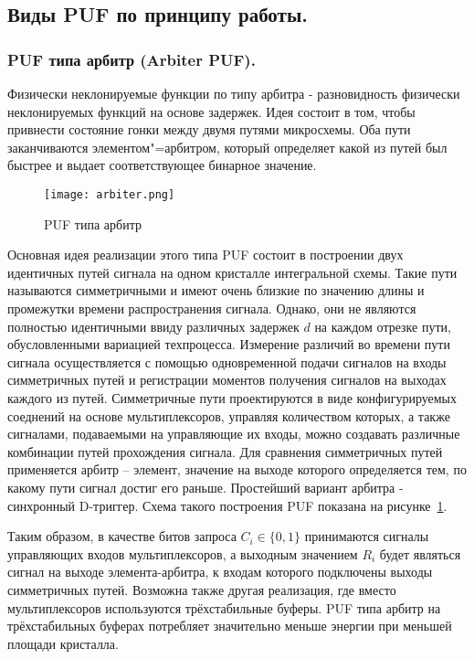 \subsection{Виды PUF по принципу работы. }
\label{sub:domain:puf_types}


\subsubsection{PUF типа арбитр (Arbiter PUF). }
\label{sub:domain:puf_types:arbiter}

Физически неклонируемые функции по типу арбитра - разновидность физически неклонируемых функций на основе задержек. Идея состоит в том, чтобы привнести состояние гонки между двумя путями микросхемы. Оба пути заканчиваются элементом"=арбитром, который определяет какой из путей был быстрее и выдает соответствующее бинарное значение.
\begin{figure}[ht]
    \centering
    \texttt{[image: arbiter.png]}
    \caption{PUF типа арбитр}
    \label{fig:domain:puf_types:arbiter}
\end{figure}

Основная идея реализации этого типа PUF состоит в построении двух идентичных путей сигнала на одном кристалле интегральной схемы. Такие пути называются симметричными и имеют очень близкие по значению длины и промежутки времени распространения сигнала. Однако, они не являются полностью идентичными ввиду различных задержек $d$ на каждом отрезке пути, обусловленными вариацией техпроцесса. Измерение различий во времени пути сигнала осуществляется с помощью одновременной подачи сигналов на входы симметричных путей и регистрации моментов получения сигналов на выходах каждого из путей. Симметричные пути проектируются в виде конфигурируемых соеднений на основе мультиплексоров, управляя количеством которых, а также сигналами, подаваемыми на управляющие их входы, можно создавать различные комбинации путей прохождения сигнала. Для сравнения симметричных путей применяется арбитр -- элемент, значение на выходе которого определяется тем, по какому пути сигнал достиг его раньше. Простейший вариант арбитра - синхронный D-триггер. Схема такого построения PUF показана на рисунке~\ref{fig:domain:puf_types:arbiter}.

Таким образом, в качестве битов запроса $C_i \in \{0,1\} $ принимаются сигналы управляющих входов мультиплексоров, а выходным значением $R_i$ будет являться сигнал на выходе элемента-арбитра, к входам которого подключены выходы симметричных путей. Возможна также другая реализация, где вместо мультиплексоров используются трёхстабильные буферы. PUF типа арбитр на трёхстабильных буферах потребляет значительно меньше энергии при меньшей площади кристалла.

